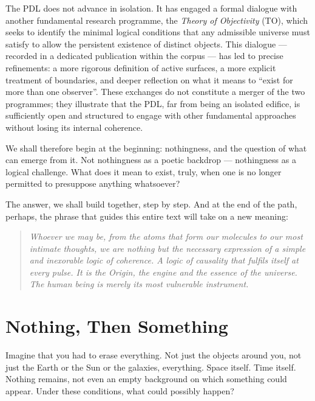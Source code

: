 \documentclass[11pt, a4paper, openright]{book}
\begin{document}
\medskip

The PDL does not advance in isolation. It has engaged a formal dialogue with another fundamental research programme, the \emph{Theory of Objectivity} (TO), which seeks to identify the minimal logical conditions that any admissible universe must satisfy to allow the persistent existence of distinct objects. This dialogue --- recorded in a dedicated publication within the corpus --- has led to precise refinements: a more rigorous definition of active surfaces, a more explicit treatment of boundaries, and deeper reflection on what it means to ``exist for more than one observer''. These exchanges do not constitute a merger of the two programmes; they illustrate that the PDL, far from being an isolated edifice, is sufficiently open and structured to engage with other fundamental approaches without losing its internal coherence.

\medskip

We shall therefore begin at the beginning: nothingness, and the question of what can emerge from it. Not nothingness as a poetic backdrop --- nothingness as a logical challenge. What does it mean to exist, truly, when one is no longer permitted to presuppose anything whatsoever?

\medskip

The answer, we shall build together, step by step. And at the end of the path, perhaps, the phrase that guides this entire text will take on a new meaning:

\begin{quote}
\itshape Whoever we may be, from the atoms that form our molecules to our most intimate thoughts, we are nothing but the necessary expression of a simple and inexorable logic of coherence. A logic of causality that fulfils itself at every pulse. It is the Origin, the engine and the essence of the universe. The human being is merely its most vulnerable instrument.
\end{quote}

\chapter{Nothing, Then Something}

Imagine that you had to erase everything. Not just the objects around you, not just the Earth or the Sun or the galaxies, everything. Space itself. Time itself. Nothing remains, not even an empty background on which something could appear. Under these conditions, what could possibly happen?
\end{document}

